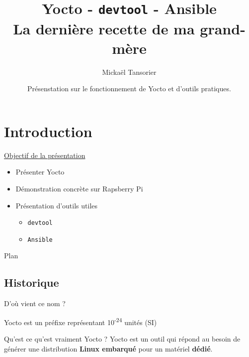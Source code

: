 \documentclass[compress]{smilebeamer}
\title[Yocto]{Yocto - \texttt{devtool} - Ansible \\ \textbf{La dernière recette de ma grand-mère}}
\author[Mickaël Tansorier]{Mickaël Tansorier}
\date[Mars 2018]{Présenstation sur le fonctionnement de Yocto et d'outils pratiques.}
\begin{document}


\begin{frame}
\titlepage
\end{frame}



\section{Introduction}

\begin{frame}
\underline{Objectif de la présentation}
\begin{itemize}
	\item Présenter Yocto
	\item Démonstration concrète sur Rapsberry Pi
	\item Présentation d'outils utiles
	\begin{itemize}
		\item \texttt{devtool}
		\item \texttt{Ansible}
	\end{itemize}
\end{itemize}
\end{frame}


\begin{frame}{Plan}
\tableofcontents[hideallsubsections]
\end{frame}


\subsection{Historique}

\begin{frame}{D'où vient ce nom ?}
\begin{definition}
	Yocto est un préfixe représentant 10\textsuperscript{-24} unités (SI)
\end{definition}
\end{frame}

\begin{frame}
\begin{block}{Qu'est ce qu'est vraiment Yocto ?}
	Yocto est un outil qui répond au besoin de générer une distribution
	\textbf{Linux embarqué} pour un matériel \textbf{dédié}.
\end{block}
\end{frame}
\end{document}
